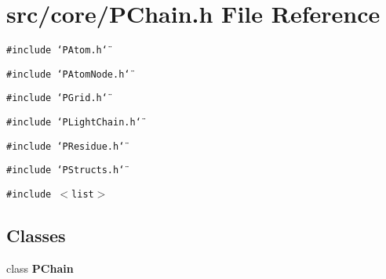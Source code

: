 \section{src/core/PChain.h File Reference}
\label{PChain_8h}


{\tt \#include \char`\"{}PAtom.h\char`\"{}}\par
{\tt \#include \char`\"{}PAtom\-Node.h\char`\"{}}\par
{\tt \#include \char`\"{}PGrid.h\char`\"{}}\par
{\tt \#include \char`\"{}PLight\-Chain.h\char`\"{}}\par
{\tt \#include \char`\"{}PResidue.h\char`\"{}}\par
{\tt \#include \char`\"{}PStructs.h\char`\"{}}\par
{\tt \#include $<$list$>$}\par
\subsection*{Classes}
\begin{CompactItemize}
\item 
class {\bf PChain}
\end{CompactItemize}
